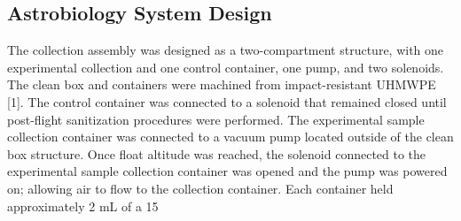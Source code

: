 \subsection{Astrobiology System Design}
\label{sec:Astrobiology Design}
The collection assembly was designed as a two-compartment structure, with one experimental collection and one control container, one pump, and two solenoids. The clean box and containers were machined from impact-resistant UHMWPE [1]. The control container was connected to a solenoid that remained closed until post-flight sanitization procedures were performed. The experimental sample collection container was connected to a vacuum pump located outside of the clean box structure. Once float altitude was reached, the solenoid connected to the experimental sample collection container was opened and the pump was powered on; allowing air to flow to the collection container. Each container held approximately 2 mL of a 15 %